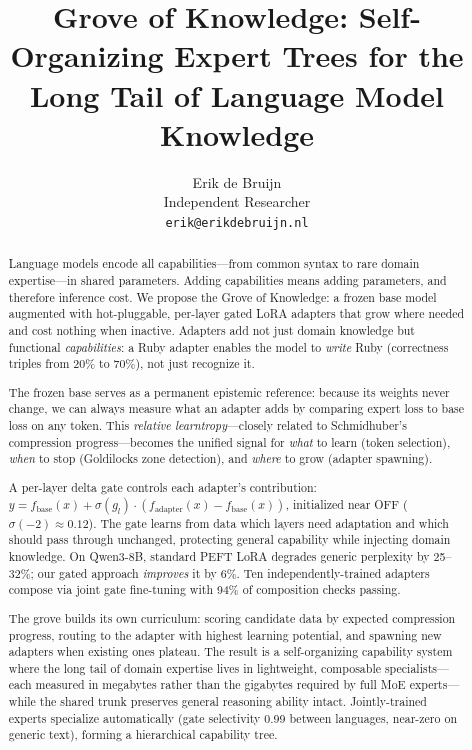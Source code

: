 \documentclass{article}
\title{Grove of Knowledge: Self-Organizing Expert Trees for the \\ Long Tail of Language Model Knowledge}
\author{
  Erik de Bruijn \\
  Independent Researcher \\
  \texttt{erik@erikdebruijn.nl}
}
\newcommand{\grove}{Grove of Knowledge}
\begin{document}
\maketitle

\begin{abstract}
Language models encode all capabilities---from common syntax to rare
domain expertise---in shared parameters. Adding capabilities means adding
parameters, and therefore inference cost. We propose the \grove{}: a
frozen base model augmented with hot-pluggable, per-layer gated LoRA
adapters that grow where needed and cost nothing when inactive.
Adapters add not just domain knowledge but functional
\emph{capabilities}: a Ruby adapter enables the model to \emph{write}
Ruby (correctness triples from 20\% to 70\%), not just recognize it.

The frozen base serves as a permanent epistemic reference: because its
weights never change, we can always measure what an adapter adds by
comparing expert loss to base loss on any token. This \emph{relative
learntropy}---closely related to Schmidhuber's compression
progress---becomes the unified signal for \emph{what} to learn (token
selection), \emph{when} to stop (Goldilocks zone detection), and
\emph{where} to grow (adapter spawning).

A per-layer delta gate controls each adapter's contribution:
$y = f_{\text{base}}(x) + \sigma(g_l) \cdot (f_{\text{adapter}}(x) -
f_{\text{base}}(x))$, initialized near OFF ($\sigma(-2) \approx 0.12$).
The gate learns from data which layers need adaptation and which should
pass through unchanged, protecting general capability while injecting
domain knowledge. On Qwen3-8B, standard PEFT LoRA degrades generic
perplexity by 25--32\%; our gated approach \emph{improves} it by 6\%.
Ten independently-trained adapters compose via joint gate fine-tuning
with 94\% of composition checks passing.

The grove builds its own curriculum: scoring candidate data by expected
compression progress, routing to the adapter with highest learning
potential, and spawning new adapters when existing ones plateau. The
result is a self-organizing capability system where the long tail of
domain expertise lives in lightweight, composable specialists---each
measured in megabytes rather than the gigabytes required by full MoE
experts---while the shared trunk preserves general reasoning ability
intact. Jointly-trained experts specialize
automatically (gate selectivity 0.99 between languages, near-zero on
generic text), forming a hierarchical capability tree.
\end{abstract}
\end{document}
